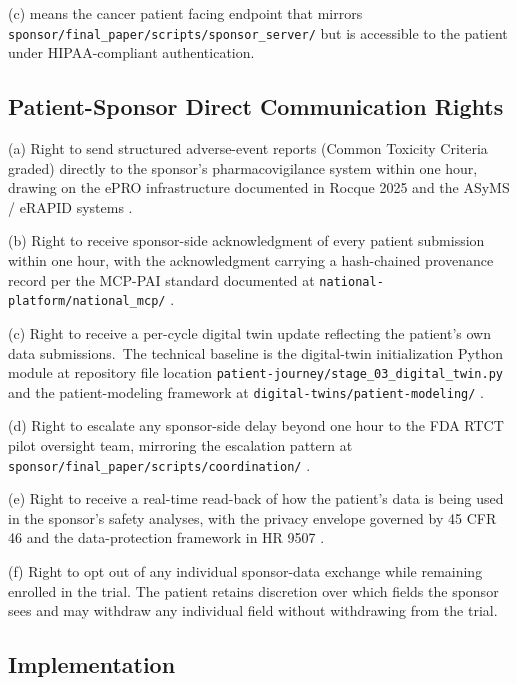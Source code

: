(c)  means the cancer patient
facing endpoint that mirrors
\texttt{sponsor/final\_paper/scripts/sponsor\_server/} but is
accessible to the patient under HIPAA-compliant authentication.

\subsection{Patient-Sponsor Direct Communication Rights}

\hspace{0.5cm} (a) Right to send structured adverse-event reports (Common Toxicity
Criteria graded) directly to the sponsor's pharmacovigilance system
within one hour, drawing on the ePRO infrastructure documented in
Rocque 2025 and the ASyMS / eRAPID systems
\cite{rocque2025remote_symptom_monitoring, kearney2009asyms,
maguire2017esmart, absolom2021erapid}.

(b) Right to receive sponsor-side acknowledgment of every patient
submission within one hour, with the acknowledgment carrying a
hash-chained provenance record per the MCP-PAI standard documented
at \texttt{national-platform/national\_mcp/}
\cite{kawchak_2026_19244918}.

(c) Right to receive a per-cycle digital twin update reflecting
the patient's own data submissions.\ The technical baseline is the
digital-twin initialization Python module at repository file location
\texttt{patient-journey/stage\_03\_digital\_twin.py} and the
patient-modeling framework at
\texttt{digital-twins/patient-modeling/}
\cite{kawchak_2026_19119939}.

(d) Right to escalate any sponsor-side delay beyond one hour to
the FDA RTCT pilot oversight team, mirroring the escalation
pattern at \texttt{sponsor/final\_paper/scripts/coordination/}
\cite{kawchak_2026_19396256}.

(e) Right to receive a real-time read-back of how the patient's
data is being used in the sponsor's safety analyses, with the
privacy envelope governed by 45 CFR 46 and the data-protection
framework in HR 9507 \cite{hhs_45cfr46_protection_human_subjects}.

(f) Right to opt out of any individual sponsor-data exchange while
remaining enrolled in the trial. The patient retains discretion
over which fields the sponsor sees and may withdraw any individual
field without withdrawing from the trial.

\subsection{Implementation}

